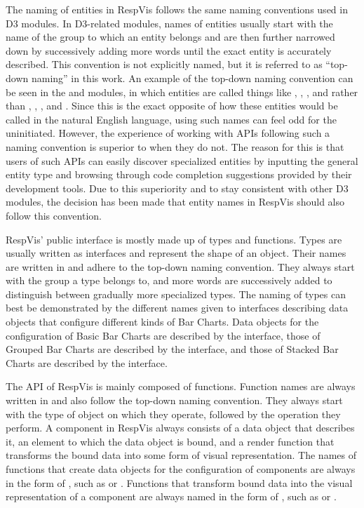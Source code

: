 The naming of entities in RespVis follows the same naming conventions used in D3 modules.
In D3-related modules, names of entities usually start with the name of the group to which an entity belongs and are then further narrowed down by successively adding more words until the exact entity is accurately described.
This convention is not explicitly named, but it is referred to as \enquote{top-down naming} in this work.
An example of the top-down naming convention can be seen in the  \parencite{D3Scale} and  \parencite{D3Axis} modules, in which entities are called things like , , , and  rather than , , , and .
Since this is the exact opposite of how these entities would be called in the natural English language, using such names can feel odd for the uninitiated. 
However, the experience of working with APIs following such a naming convention is superior to when they do not.
The reason for this is that users of such APIs can easily discover specialized entities by inputting the general entity type and browsing through code completion suggestions provided by their development tools.
Due to this superiority and to stay consistent with other D3 modules, the decision has been made that entity names in RespVis should also follow this convention.

RespVis' public interface is mostly made up of types and functions.
Types are usually written as interfaces and represent the shape of an object. 
Their names are written in  and adhere to the top-down naming convention.
They always start with the group a type belongs to, and more words are successively added to distinguish between gradually more specialized types.
The naming of types can best be demonstrated by the different names given to interfaces describing data objects that configure different kinds of Bar Charts.
Data objects for the configuration of Basic Bar Charts are described by the  interface, those of Grouped Bar Charts are described by the  interface, and those of Stacked Bar Charts are described by the  interface.

The API of RespVis is mainly composed of functions.
Function names are always written in  and also follow the top-down naming convention.
They always start with the type of object on which they operate, followed by the operation they perform.
A component in RespVis always consists of a data object that describes it, an element to which the data object is bound, and a render function that transforms the bound data into some form of visual representation.
The names of functions that create data objects for the configuration of components are always in the form of , such as  or .
Functions that transform bound data into the visual representation of a component are always named in the form of , such as  or . 


